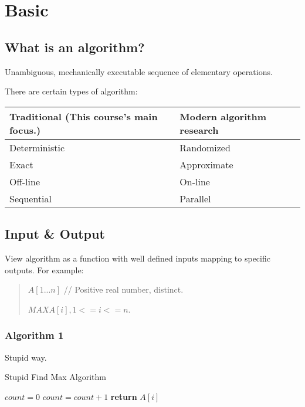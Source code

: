 \section{Basic}
\subsection{What is an algorithm?}
Unambiguous, mechanically executable sequence of elementary operations.

There are certain types of algorithm:

\begin{tabular}{ ll }
Traditional (This course’s main focus.) & Modern algorithm research\\
\hline
Deterministic & Randomized \\
Exact & Approximate\\
Off-line & On-line\\
Sequential & Parallel\\
\end{tabular}

\subsection{Input \& Output}

View algorithm as a function with well defined inputs mapping to specific
outputs. For example:

\begin{quote}

\AlgoInput $A[1...n]$  // Positive real number, distinct.

\AlgoOutput $MAX A[i], 1<= i <= n$.

\end{quote}

\subsubsection{Algorithm 1}

Stupid way.

\begin{algorithm}[H]
\caption{Stupid Find Max Algorithm}\label{Stupid_Find_Max_Algorithm}
\begin{algorithmic}[1]
  \State $count = 0$
      \State $count = count + 1$
    \EndIf
  \EndFor
    \State \textbf{return} {$A[i]$}
  \EndIf
\EndFor
\EndProcedure
\end{algorithmic}
\end{algorithm}

